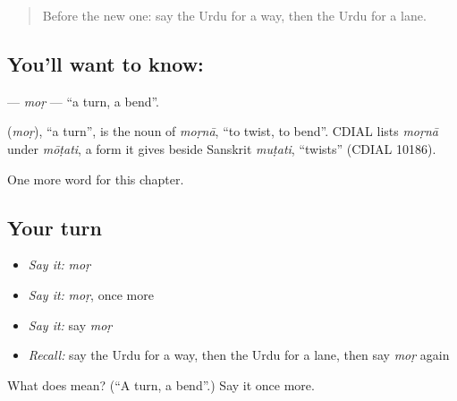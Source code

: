 \begin{quote}
Before the new one: say the Urdu for a way, then the Urdu for a lane.
\end{quote}

\subsection*{You'll want to know: }
\textbf{} — \emph{moṛ} — \textquotedblleft{}a turn, a bend\textquotedblright{}.

\begin{cousinweb}
\textbf{} (\emph{moṛ}), \textquotedblleft{}a turn\textquotedblright{}, is the noun of \emph{moṛnā}, \textquotedblleft{}to twist, to bend\textquotedblright{}. CDIAL lists \emph{moṛnā} under \emph{mōṭati}, a form it gives beside Sanskrit \emph{muṭati}, \textquotedblleft{}twists\textquotedblright{} (CDIAL 10186).
\end{cousinweb}

\begin{grammarlens}[title={What you've built}]
One more word for this chapter.
\end{grammarlens}

\subsection*{Your turn}
\begin{itemize}
\raggedright
  \item \emph{Say it:} \emph{moṛ}
  \item \emph{Say it:} \emph{moṛ}, once more
  \item \emph{Say it:} say \emph{moṛ}
  \item \emph{Recall:} say the Urdu for a way, then the Urdu for a lane, then say \emph{moṛ} again
\end{itemize}

\begin{tcolorbox}[breakable,colback=teal!4,colframe=teal!35!black,title={Before you move on}]
What does  mean? (\textquotedblleft{}A turn, a bend\textquotedblright{}.) Say it once more.
\end{tcolorbox}
